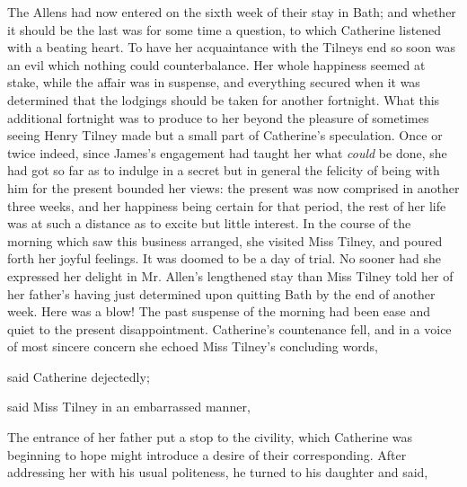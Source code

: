 The Allens had now entered on the sixth week of their stay in Bath; and whether it should be the last was for some time a question, to which Catherine listened with a beating heart. To have her acquaintance with the Tilneys end so soon was an evil which nothing could counterbalance. Her whole happiness seemed at stake, while the affair was in suspense, and everything secured when it was determined that the lodgings should be taken for another fortnight. What this additional fortnight was to produce to her beyond the pleasure of sometimes seeing Henry Tilney made but a small part of Catherine's speculation. Once or twice indeed, since James's engagement had taught her what {\em could} be done, she had got so far as to indulge in a secret  but in general the felicity of being with him for the present bounded her views: the present was now comprised in another three weeks, and her happiness being certain for that period, the rest of her life was at such a distance as to excite but little interest. In the course of the morning which saw this business arranged, she visited Miss Tilney, and poured forth her joyful feelings. It was doomed to be a day of trial. No sooner had she expressed her delight in Mr. Allen's lengthened stay than Miss Tilney told her of her father's having just determined upon quitting Bath by the end of another week. Here was a blow! The past suspense of the morning had been ease and quiet to the present disappointment. Catherine's countenance fell, and in a voice of most sincere concern she echoed Miss Tilney's concluding words, 


 said Catherine dejectedly; 

 said Miss Tilney in an embarrassed manner, 

The entrance of her father put a stop to the civility, which Catherine was beginning to hope might introduce a desire of their corresponding. After addressing her with his usual politeness, he turned to his daughter and said, 

